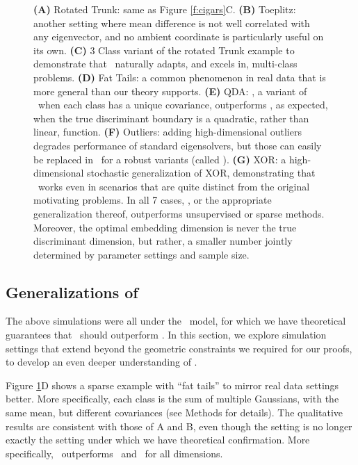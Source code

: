 \documentclass[10pt]{article}
\begin{document}
\begin{figure}[h!]
{\textbf{(A)} Rotated Trunk: same as Figure \ref{f:cigars}C.
\textbf{(B)} Toeplitz: another setting where mean difference is not well correlated with any eigenvector, and no ambient coordinate is particularly useful on its own.
\textbf{(C)} 3 Class variant of the rotated Trunk example to demonstrate that \Lol~naturally adapts, and excels in, multi-class problems.
\textbf{(D)} Fat Tails: a common phenomenon in real data that is more general than our theory supports.
\textbf{(E)} QDA: \Qoq, a variant of \Lol~when each class has a unique covariance, outperforms \Lol, as expected, when the true discriminant boundary is a quadratic, rather than linear, function.
\textbf{(F)} Outliers: adding high-dimensional outliers degrades performance of standard eigensolvers, but those can easily be replaced in \Lol~for a robust variants (called \Lrl).
\textbf{(G)} XOR: a high-dimensional stochastic generalization of XOR, demonstrating that \Qoq~works even in scenarios that are quite distinct from the original motivating problems.
In all 7 cases, \Lol, or the appropriate generalization thereof, outperforms unsupervised or sparse methods.  Moreover, the optimal embedding dimension is never the true discriminant dimension, but rather, a smaller number jointly determined by parameter settings and sample size.
}
\label{f:properties}
\end{figure}



\subsection*{Generalizations of \Lol}


The above simulations were all under the \Lda~model, for which we have theoretical guarantees that \Lol~should outperform \PoF.  In this section, we explore simulation settings that extend beyond the geometric constraints we required for our proofs, to develop an even deeper understanding of \Lol.

 Figure \ref{f:properties}D shows a sparse example with ``fat tails'' to mirror real data settings better. More specifically, each class is the sum of multiple Gaussians, with the same mean, but different covariances (see Methods for details). The qualitative results are consistent with those of A and B, even though the setting is no longer exactly the setting under which we have theoretical confirmation. More specifically, \Lol~outperforms \PoF~and \Road~for all dimensions.
\end{document}
